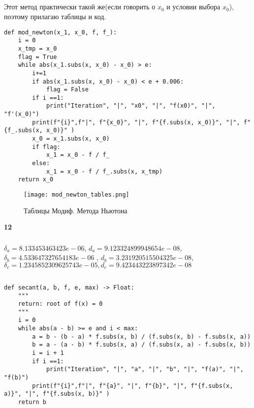\documentclass[a4paper,12pt]{article}
\begin{document}
\subsection{}
Этот метод практически такой же(если говорить о $x_0$ и условии выбора $x_0$), поэтому прилагаю таблицы и код.
\begin{lstlisting}
def mod_newton(x_1, x_0, f, f_):
    i = 0
    x_tmp = x_0
    flag = True
    while abs(x_1.subs(x, x_0) - x_0) > e:
        i+=1
        if abs(x_1.subs(x, x_0) - x_0) < e + 0.006:
            flag = False
        if i ==1:
            print("Iteration", "|", "x0", "|", "f(x0)", "|", "f'(x_0)")
        print(f"{i}",f"|", f"{x_0}", "|", f"{f.subs(x, x_0)}", "|", f"{f_.subs(x, x_0)}" )
        x_0 = x_1.subs(x, x_0)
        if flag:
            x_1 = x_0 - f / f_
        else:
            x_1 = x_0 - f / f_.subs(x, x_tmp)
    return x_0
\end{lstlisting}
\begin{figure}[h]
    \centering
    \texttt{[image: mod\_newton\_tables.png]}
    \caption{Таблицы Модиф. Метода Ньютона}
    \label{mod_newton_tables}
\end{figure}
\newpage
\begin{center}
{\bf12}\\
\vspace{0.5cm}
\end{center}
\setcounter{page}{12}
\subsubsection{}
$\delta_a = 8.133453463423e-06$, $d_a = 9.123324899948654e-08$, $\delta_b = 4.533647327654183e-06$ , $d_b = 3.231920515504325e-08$, $\delta_c = 1.2345852309625743e-05, d_c = 9.423443223897342e-08$

\subsection{}

\begin{lstlisting}
def secant(a, b, f, e, max) -> Float:
    """
    return: root of f(x) = 0
    """
    i = 0
    while abs(a - b) >= e and i < max:
        a = b - (b - a) * f.subs(x, b) / (f.subs(x, b) - f.subs(x, a))
        b = a - (a - b) * f.subs(x, a) / (f.subs(x, a) - f.subs(x, b))
        i = i + 1
        if i ==1:
            print("Iteration", "|", "a", "|", "b", "|", "f(a)", "|", "f(b)")
        print(f"{i}",f"|", f"{a}", "|", f"{b}", "|", f"{f.subs(x, a)}", "|", f"{f.subs(x, b)}" )
    return b
\end{lstlisting}
\end{document}
